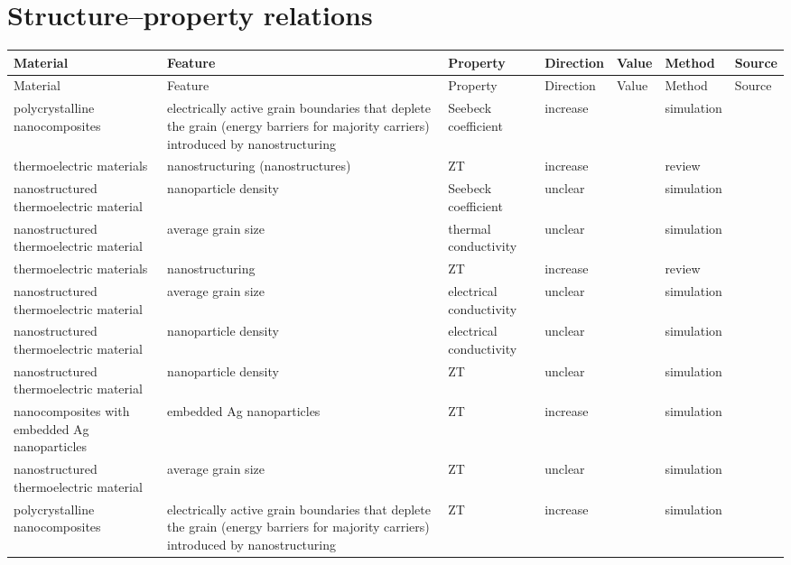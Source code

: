 \documentclass[11pt,a4paper]{article}
\begin{document}
\section{Structure--property relations}
\begin{longtable}{p{22mm}p{26mm}p{24mm}p{16mm}p{20mm}p{14mm}l}
\toprule
Material & Feature & Property & Direction & Value & Method & Source \\
\midrule
\endfirsthead\toprule
Material & Feature & Property & Direction & Value & Method & Source \\
\midrule\endhead\bottomrule\endfoot
polycrystalline nanocomposites & electrically active grain boundaries that deplete the grain (energy barriers for majority carriers) introduced by nanostructuring & Seebeck coefficient & increase &  & simulation & \cite{LimitationsOfZtAsAFigure201962331153} \\
thermoelectric materials & nanostructuring (nanostructures) & ZT & increase &  & review & \cite{LimitationsOfZtAsAFigure201962331153} \\
nanostructured thermoelectric material & nanoparticle density & Seebeck coefficient & unclear &  & simulation & \cite{LimitationsOfZtAsAFigure201962331153} \\
nanostructured thermoelectric material & average grain size & thermal conductivity & unclear &  & simulation & \cite{LimitationsOfZtAsAFigure201962331153} \\
thermoelectric materials & nanostructuring & ZT & increase &  & review & \cite{LimitationsOfZtAsAFigure201962331153} \\
nanostructured thermoelectric material & average grain size & electrical conductivity & unclear &  & simulation & \cite{LimitationsOfZtAsAFigure201962331153} \\
nanostructured thermoelectric material & nanoparticle density & electrical conductivity & unclear &  & simulation & \cite{LimitationsOfZtAsAFigure201962331153} \\
nanostructured thermoelectric material & nanoparticle density & ZT & unclear &  & simulation & \cite{LimitationsOfZtAsAFigure201962331153} \\
nanocomposites with embedded Ag nanoparticles & embedded Ag nanoparticles & ZT & increase &  & simulation & \cite{LimitationsOfZtAsAFigure201962331153} \\
nanostructured thermoelectric material & average grain size & ZT & unclear &  & simulation & \cite{LimitationsOfZtAsAFigure201962331153} \\
polycrystalline nanocomposites & electrically active grain boundaries that deplete the grain (energy barriers for majority carriers) introduced by nanostructuring & ZT & increase &  & simulation & \cite{LimitationsOfZtAsAFigure201962331153} \\

\end{longtable}
\end{document}
